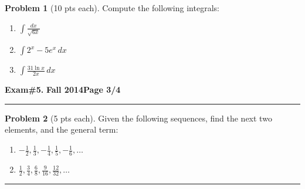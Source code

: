 \documentclass[12pt]{article}
\theoremstyle{definition}
\newtheorem{problem}{Problem}
\begin{document}
\begin{problem}[10 pts each] 
Compute the following integrals:
\begin{enumerate}
\item $\displaystyle{\int \frac{dx}{\sqrt{6x}}}$
\vspace{1cm}
\begin{flushright}
\end{flushright}
\item $\displaystyle{\int 2^x-5e^x\, dx}$
\vspace{2.5cm}
\begin{flushright}
\end{flushright}
\item $\displaystyle{\int \frac{31 \ln x}{ 2x }\, dx}$
\vspace{3cm}
\begin{flushright}
\end{flushright}
\end{enumerate}
\end{problem}
\newpage

\hfill{\large\bf Exam\#5.}\hfill{\large\bf
Fall 2014}\hfill{\large\bf Page 3/4}\hrule

\bigskip

\begin{problem}[5 pts each] 
Given the following sequences, find the next two elements, and the general term:
\begin{enumerate}
\item $-\frac{1}{2},\frac{1}{3},-\frac{1}{4},\frac{1}{5},-\frac{1}{6},\dotsc$

\vspace{0.5cm}
\begin{flushright}
\end{flushright}
\item $\frac{1}{2}, \frac{3}{4}, \frac{6}{8}, \frac{9}{16}, \frac{12}{32}, \dotsc$

\vspace{0.5cm}
\begin{flushright}
\end{flushright}
\end{enumerate}
\end{problem}
\hrule
\end{document}

